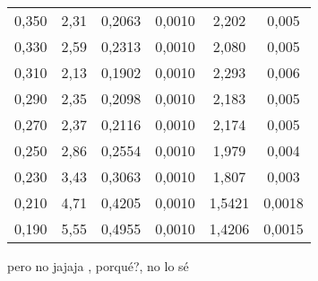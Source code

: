 \documentclass[a4paper,10pt,twocolumns]{article}
\begin{document}
{\begin{table}[htbp]
\begin{tabular}{|c|c|c|c|c|c|}
0,350 & 2,31 & 0,2063 & 0,0010 & 2,202 & 0,005 \\ 
0,330 & 2,59 & 0,2313 & 0,0010 & 2,080 & 0,005 \\ 
0,310 & 2,13 & 0,1902 & 0,0010 & 2,293 & 0,006 \\ 
0,290 & 2,35 & 0,2098 & 0,0010 & 2,183 & 0,005 \\ 
0,270 & 2,37 & 0,2116 & 0,0010 & 2,174 & 0,005 \\ 
0,250 & 2,86 & 0,2554 & 0,0010 & 1,979 & 0,004 \\ 
0,230 & 3,43 & 0,3063 & 0,0010 & 1,807 & 0,003 \\ 
0,210 & 4,71 & 0,4205 & 0,0010 & 1,5421 & 0,0018 \\ 
0,190 & 5,55 & 0,4955 & 0,0010 & 1,4206 & 0,0015 \\ \hline
\end{tabular}
\label{}
\end{table}
 pero no jajaja , porqué?, no lo sé

}
\end{document}
